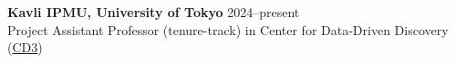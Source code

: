 {\bf Kavli IPMU, University of Tokyo} \hfill 2024--present \\
Project Assistant Professor (tenure-track) in Center for Data-Driven Discovery (\href{https://cd3.ipmu.jp}{CD3})
